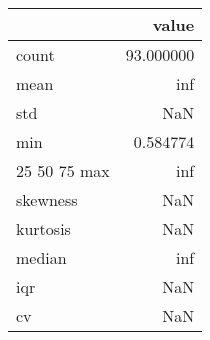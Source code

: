 \begin{tabular}{lr}
\toprule
 & value \\
\midrule
count & 93.000000 \\
mean & inf \\
std & NaN \\
min & 0.584774 \\
25%
50%
75%
max & inf \\
skewness & NaN \\
kurtosis & NaN \\
median & inf \\
iqr & NaN \\
cv & NaN \\
\bottomrule
\end{tabular}
